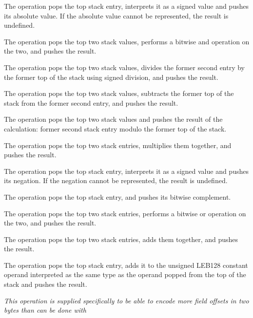 \begin{enumerate}[1. ]
\itembfnl{\DWOPabsTARG}
The \DWOPabsNAME{} operation pops the top stack entry, interprets
it as a signed value and pushes its absolute value. If the
absolute value cannot be represented, the result is undefined.

\itembfnl{\DWOPandTARG}
The \DWOPandNAME{} operation pops the top two stack values, performs
a bitwise and operation on the two, and pushes the result.

\itembfnl{\DWOPdivTARG}
The \DWOPdivNAME{} operation pops the top two stack values, divides the former second entry by
the former top of the stack using signed division, and pushes the result.

\itembfnl{\DWOPminusTARG}
The \DWOPminusNAME{} operation pops the top two stack values, subtracts the former top of the
stack from the former second entry, and pushes the result.

\itembfnl{\DWOPmodTARG}
The \DWOPmodNAME{} operation pops the top two stack values and pushes the result of the
calculation: former second stack entry modulo the former top of the stack.

\itembfnl{\DWOPmulTARG}
The \DWOPmulNAME{} operation pops the top two stack entries, multiplies them together, and
pushes the result.

\itembfnl{\DWOPnegTARG}
The \DWOPnegNAME{} operation pops the top stack entry, interprets
it as a signed value and pushes its negation. If the negation
cannot be represented, the result is undefined.

\itembfnl{\DWOPnotTARG}
The \DWOPnotNAME{} operation pops the top stack entry, and pushes
its bitwise complement.

\itembfnl{\DWOPorTARG}
The \DWOPorNAME{} operation pops the top two stack entries, performs
a bitwise or operation on the two, and pushes the result.

\itembfnl{\DWOPplusTARG}
The \DWOPplusNAME{} operation pops the top two stack entries,
adds them together, and pushes the result.

\itembfnl{\DWOPplusuconstTARG}
The \DWOPplusuconstNAME{} operation pops the top stack entry,
adds it to the unsigned LEB128
constant operand
interpreted as the same type as the operand popped from the
top of the stack and pushes the result.

\textit{This operation is supplied specifically to be
able to encode more field offsets in two bytes than can be
done with
}


\end{enumerate}
